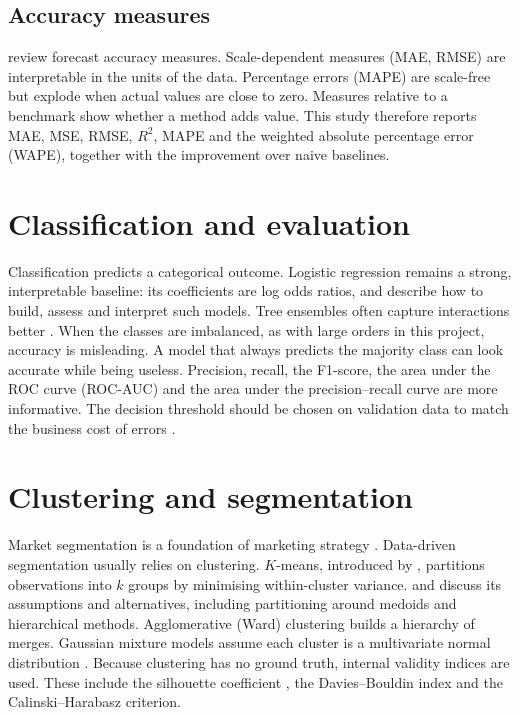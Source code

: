\subsection{Accuracy measures}
\citet{hyndman2006} review forecast accuracy measures. Scale-dependent measures (MAE, RMSE) are interpretable
in the units of the data. Percentage errors (MAPE) are scale-free but explode when actual values are close to
zero. Measures relative to a benchmark show whether a method adds value. This study therefore reports MAE,
MSE, RMSE, $R^2$, MAPE and the weighted absolute percentage error (WAPE), together with the improvement over
naive baselines.

\section{Classification and evaluation}
Classification predicts a categorical outcome. Logistic regression remains a strong, interpretable baseline:
its coefficients are log odds ratios, and \citet{hosmer2013} describe how to build, assess and interpret such
models. Tree ensembles often capture interactions better \citep{kuhn2013}. When the classes are imbalanced, as with
large orders in this project, accuracy is misleading. A model that always predicts the majority class can look
accurate while being useless. Precision, recall, the F1-score, the area under the ROC curve (ROC-AUC) and the
area under the precision--recall curve are more informative. The decision threshold should be chosen on
validation data to match the business cost of errors \citep{kuhn2013}.

\section{Clustering and segmentation}
Market segmentation is a foundation of marketing strategy \citep{kotler2016}. Data-driven segmentation usually
relies on clustering. $K$-means, introduced by \citet{macqueen1967}, partitions observations into $k$ groups by
minimising within-cluster variance. \citet{kaufman1990} and \citet{tan2019} discuss its assumptions and
alternatives, including partitioning around medoids and hierarchical methods.
Agglomerative (Ward) clustering builds a hierarchy of merges. Gaussian mixture models assume each cluster is a
multivariate normal distribution \citep{han2012}. Because clustering has no ground truth, internal validity
indices are used. These include the silhouette coefficient \citep{rousseeuw1987}, the Davies--Bouldin index
\citep{davies1979} and the Calinski--Harabasz criterion.

